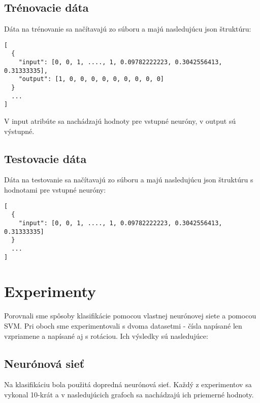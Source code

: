 
\subsection{Trénovacie dáta} %
\label{sub:vstupn_d_ta}

Dáta na trénovanie sa načítavajú zo súboru a majú nasledujúcu json štruktúru:

\begin{verbatim}
[
  { 
    "input": [0, 0, 1, ...., 1, 0.09782222223, 0.3042556413, 0.31333335],
    "output": [1, 0, 0, 0, 0, 0, 0, 0, 0, 0]
  }
  ...
]
\end{verbatim}

V input atribúte sa nachádzajú hodnoty pre vstupné neuróny, v output sú výstupné.


\subsection{Testovacie dáta} %
\label{sub:testovacie_d_ta}

Dáta na testovanie sa načítavajú zo súboru a majú nasledujúcu json štruktúru s hodnotami pre vstupné neuróny:

\begin{verbatim}
[
  { 
    "input": [0, 0, 1, ...., 1, 0.09782222223, 0.3042556413, 0.31333335]
  }
  ...
]
\end{verbatim}



\newpage
\section{Experimenty} %
\label{sec:experimenty}

Porovnali sme spôsoby klasifikácie pomocou vlastnej neurónovej siete a pomocou SVM. Pri oboch sme experimentovali s dvoma datasetmi - čísla napísané len vzpriamene a napísané aj s rotáciou. Ich výsledky sú nasledujúce:

\subsection{Neurónová sieť} %

Na klasifikáciu bola použitá dopredná neurónová sieť. Každý z experimentov sa vykonal 10-krát a v nasledujúcich grafoch sa nachádzajú ich priemerné hodnoty.

